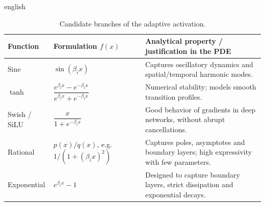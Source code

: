 \documentclass[0000.tex]{subfiles}
\begin{document}
\begin{hyphenrules}{english}
\begin{table}[htbp]
  \centering
  \caption{Candidate branches of the adaptive activation.}
  \label{tab:abu-branches}
  \small
  \begin{tabularx}{\linewidth}{@{}llX@{}}
    \toprule
    Function & Formulation $f(x)$ & Analytical property / justification in the PDE \\
    \midrule
    Sine & $\sin(\beta_ix)$ & Captures oscillatory dynamics and spatial/temporal harmonic modes. \\
    $\tanh$ & $\dfrac{e^{\beta_ix}-e^{-\beta_ix}}{e^{\beta_ix}+e^{-\beta_ix}}$ & Numerical stability; models smooth transition profiles. \\
    Swish / SiLU & $\dfrac{x}{1+e^{-\beta_ix}}$ & Good behavior of gradients in deep networks, without abrupt cancellations. \\
    Rational & $p(x)/q(x)$, e.g.\ $1/(1+(\beta_ix)^2)$ & Captures poles, asymptotes and boundary layers; high expressivity with few parameters. \\
    Exponential & $e^{\beta_ix}-1$ & Designed to capture boundary layers, strict dissipation and exponential decays. \\
    \bottomrule
  \end{tabularx}
\end{table}

\end{hyphenrules}

\ifSubfilesClassLoaded{}{}
\end{document}
